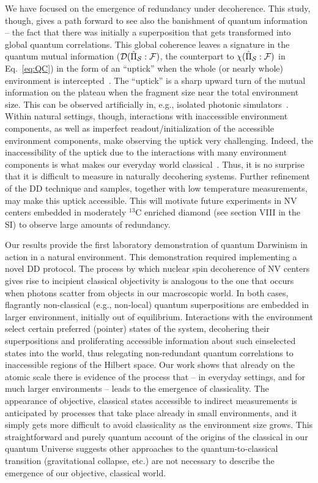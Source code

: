 \documentclass[aps,prl,floatfix,twocolumn,footinbib,superscriptaddress]{revtex4-1}
\begin{document}
We have focused on the emergence of redundancy under decoherence. This study, though, gives a path forward to see also the banishment of quantum information -- the fact that there was initially a superposition that gets transformed into global quantum correlations. This global coherence leaves a signature in the quantum mutual information ($\mathcal{D}(\hat{\Pi}_{\mathcal{S}}:\mathcal{F})$, the counterpart to $\chi ( \hat{\Pi}_{\mathcal{S}}:\mathcal{F} )$ in Eq.~\eqref{eq:QC}) in the form of an ``uptick'' when the whole (or nearly whole) environment is intercepted~\cite{Zwolak13-1}. The ``uptick''  is a sharp upward turn of the mutual information on the plateau when the fragment size near the total environment size. This can be observed artificially in, e.g., isolated photonic simulators~\cite{Ciampini18-1,Chen18-1}. Within natural settings, though, interactions with inaccessible environment components, as well as imperfect readout/initialization of the accessible environment components, make observing the uptick very challenging. Indeed, the inaccessibility of the uptick due to the interactions with many environment components is what makes our everyday world classical~\cite{Zwolak13-1}. Thus, it is no surprise that it is difficult to measure in naturally decohering systems. Further refinement of the DD technique and samples, together with low temperature measurements, may make this uptick accessible. This will motivate future experiments in NV centers embedded in moderately $^{13}$C enriched diamond (see section \RN{8} in the SI) to observe large amounts of redundancy.

Our results provide the first laboratory demonstration of quantum Darwinism in action in a natural environment. This demonstration required implementing a novel DD protocol. The process by which nuclear spin decoherence of NV centers gives rise to incipient classical objectivity is analogous to the one that occurs when photons scatter from objects in our macroscopic world. In both cases, flagrantly non-classical (e.g., non-local) quantum superpositions are embedded in larger environment, initially out of equilibrium. Interactions with the environment select certain preferred (pointer) states of the system, decohering their superpositions and proliferating accessible information about such einselected states into the world, thus relegating non-redundant quantum correlations to inaccessible regions of the Hilbert space. Our work shows that already on the atomic scale there is evidence of the process that -- in everyday settings, and for much larger environments -- leads to the emergence of classicality. The appearance of objective, classical states accessible to indirect measurements is anticipated by processes that take place already in small environments, and it simply gets more difficult to avoid classicality as the environment size grows. This straightforward and purely quantum account of the origins of the classical in our quantum Universe suggests other approaches to the quantum-to-classical transition (gravitational collapse, etc.) are not necessary to describe the emergence of our objective, classical world.\\
\end{document}
